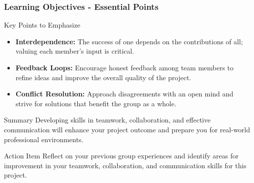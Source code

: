 \documentclass{beamer}
\begin{document}
\begin{frame}[fragile]
    \frametitle{Learning Objectives - Essential Points}
    \begin{block}{Key Points to Emphasize}
        \begin{itemize}
            \item \textbf{Interdependence:} The success of one depends on the contributions of all; valuing each member’s input is critical.
            \item \textbf{Feedback Loops:} Encourage honest feedback among team members to refine ideas and improve the overall quality of the project.
            \item \textbf{Conflict Resolution:} Approach disagreements with an open mind and strive for solutions that benefit the group as a whole.
        \end{itemize}
    \end{block}

    \begin{block}{Summary}
        Developing skills in teamwork, collaboration, and effective communication will enhance your project outcome and prepare you for real-world professional environments. 
    \end{block}

    \begin{block}{Action Item}
        Reflect on your previous group experiences and identify areas for improvement in your teamwork, collaboration, and communication skills for this project.
    \end{block}
\end{frame}
\end{document}

